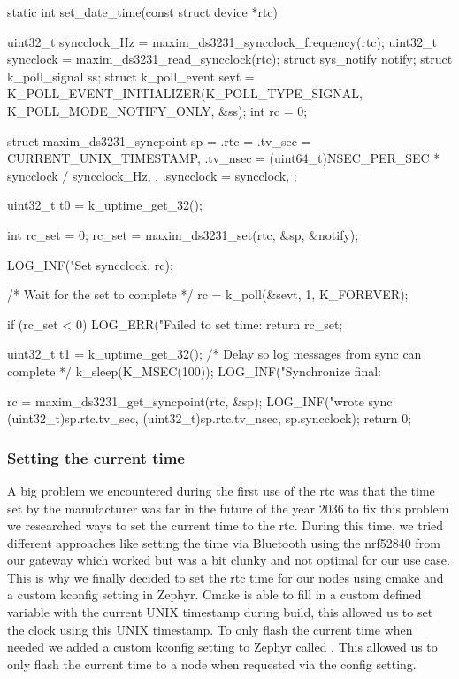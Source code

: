\begin{cpp}[caption={custom set\_date\_time function to set the current time during build}]
    static int set_date_time(const struct device *rtc)
{
    uint32_t syncclock_Hz = maxim_ds3231_syncclock_frequency(rtc);
    uint32_t syncclock = maxim_ds3231_read_syncclock(rtc);
    struct sys_notify notify;
    struct k_poll_signal ss;
    struct k_poll_event sevt = K_POLL_EVENT_INITIALIZER(K_POLL_TYPE_SIGNAL,
                                                        K_POLL_MODE_NOTIFY_ONLY,
                                                        &ss);
    int rc = 0;

    struct maxim_ds3231_syncpoint sp = {
        .rtc = {
            .tv_sec = CURRENT_UNIX_TIMESTAMP,
            .tv_nsec = (uint64_t)NSEC_PER_SEC * syncclock / syncclock_Hz,
        },
        .syncclock = syncclock,
    };

    uint32_t t0 = k_uptime_get_32();

    int rc_set = 0;
    rc_set = maxim_ds3231_set(rtc, &sp, &notify);

    LOG_INF("Set %
            syncclock, rc);

    /* Wait for the set to complete */
    rc = k_poll(&sevt, 1, K_FOREVER);

    if (rc_set < 0)
    {
        LOG_ERR("Failed to set time: %
        return rc_set;
    }

    uint32_t t1 = k_uptime_get_32();
    /* Delay so log messages from sync can complete */
	k_sleep(K_MSEC(100));
	LOG_INF("Synchronize final: %

	rc = maxim_ds3231_get_syncpoint(rtc, &sp);
	LOG_INF("wrote sync %
	       (uint32_t)sp.rtc.tv_sec, (uint32_t)sp.rtc.tv_nsec,
	       sp.syncclock);
    return 0;
}
\end{cpp}

\subsubsection{Setting the \textbf{current} time}
A big problem we encountered during the first use of the rtc was that the time set by the manufacturer was far in the future of the year 2036 to fix this problem we researched ways to set the current time to the rtc. During this time, we tried different approaches like setting the time via Bluetooth using the nrf52840 from our gateway which worked but was a bit clunky and not optimal for our use case. This is why we finally decided to set the rtc time for our nodes using cmake and a custom kconfig setting in Zephyr. Cmake is able to fill in a custom defined variable with the current UNIX timestamp during build, this allowed us to set the clock using this UNIX timestamp. To only flash the current time when needed we added a custom kconfig setting to Zephyr called . This allowed us to only flash the current time to a node when requested via the config setting. 

